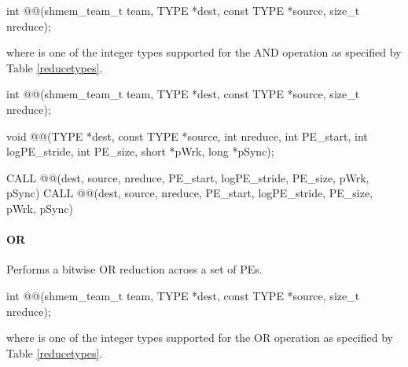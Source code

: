 \begin{apidefinition}
{\color{Green}
\begin{C11synopsis}
int @@(shmem_team_t team, TYPE *dest, const TYPE *source, size_t nreduce);
\end{C11synopsis}
where \TYPE{} is one of the integer types supported for the AND operation as specified by Table \ref{reducetypes}.
}

\begin{Csynopsis}
\end{Csynopsis}
{\color{Green}
\begin{CsynopsisCol}
int @@(shmem_team_t team, TYPE *dest, const TYPE *source, size_t nreduce);
\end{CsynopsisCol}
}
\begin{DeprecateBlock}
\begin{CsynopsisCol}
void @@(TYPE *dest, const TYPE *source, int nreduce, int PE_start, int logPE_stride, int PE_size, short *pWrk, long *pSync);
\end{CsynopsisCol}
\end{DeprecateBlock}

\begin{Fsynopsis}
CALL @@(dest, source, nreduce, PE_start, logPE_stride, PE_size, pWrk, pSync)
CALL @@(dest, source, nreduce, PE_start, logPE_stride, PE_size, pWrk, pSync)
\end{Fsynopsis}

\paragraph{OR}
Performs a bitwise OR reduction across a set of \acp{PE}.\newline

{\color{Green}
\begin{C11synopsis}
int @@(shmem_team_t team, TYPE *dest, const TYPE *source, size_t nreduce);
\end{C11synopsis}
where \TYPE{} is one of the integer types supported for the OR operation as specified by Table \ref{reducetypes}.
}


\end{apidefinition}
